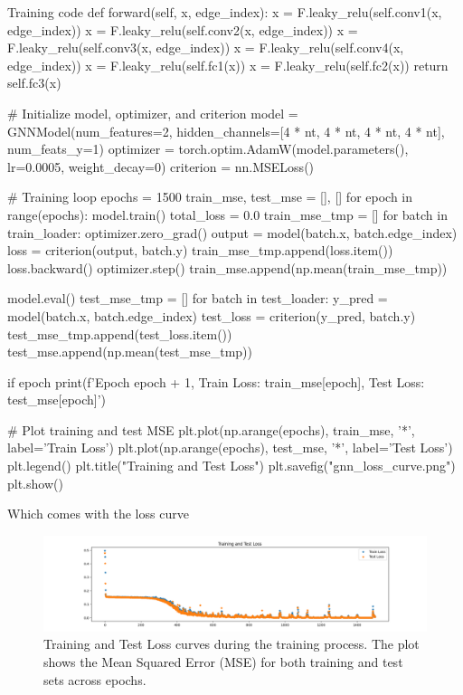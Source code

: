 \begin{codeonly}{Training code}
    def forward(self, x, edge_index):
        x = F.leaky_relu(self.conv1(x, edge_index))
        x = F.leaky_relu(self.conv2(x, edge_index))
        x = F.leaky_relu(self.conv3(x, edge_index))
        x = F.leaky_relu(self.conv4(x, edge_index))
        x = F.leaky_relu(self.fc1(x))
        x = F.leaky_relu(self.fc2(x))
        return self.fc3(x)

# Initialize model, optimizer, and criterion
model = GNNModel(num_features=2, hidden_channels=[4 * nt, 4 * nt, 4 * nt, 4 * nt], num_feats_y=1)
optimizer = torch.optim.AdamW(model.parameters(), lr=0.0005, weight_decay=0)
criterion = nn.MSELoss()

# Training loop
epochs = 1500
train_mse, test_mse = [], []
for epoch in range(epochs):
    model.train()
    total_loss = 0.0
    train_mse_tmp = []
    for batch in train_loader:
        optimizer.zero_grad()
        output = model(batch.x, batch.edge_index)
        loss = criterion(output, batch.y)
        train_mse_tmp.append(loss.item())
        loss.backward()
        optimizer.step()
    train_mse.append(np.mean(train_mse_tmp))

    model.eval()
    test_mse_tmp = []
    for batch in test_loader:
        y_pred = model(batch.x, batch.edge_index)
        test_loss = criterion(y_pred, batch.y)
        test_mse_tmp.append(test_loss.item())
    test_mse.append(np.mean(test_mse_tmp))

    if epoch %
        print(f'Epoch {epoch + 1}, Train Loss: {train_mse[epoch]}, Test Loss: {test_mse[epoch]}')

# Plot training and test MSE
plt.plot(np.arange(epochs), train_mse, '*', label='Train Loss')
plt.plot(np.arange(epochs), test_mse, '*', label='Test Loss')
plt.legend()
plt.title("Training and Test Loss")
plt.savefig("gnn_loss_curve.png")
plt.show()
\end{codeonly}

Which comes with the loss curve

\begin{figure}[h!]
    \centering
    \begin{minipage}{0.8\textwidth}
        \centering
        \includegraphics[width=\textwidth]{images/gnn_loss_curve.png}
        \caption{Training and Test Loss curves during the training process. The plot shows the Mean Squared Error (MSE) for both training and test sets across epochs.}
        \label{fig:gnn_test_2}
    \end{minipage}
\end{figure}

